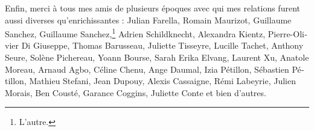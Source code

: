 \begin{otherlanguage}{french}
\begin{SingleSpace}
  Enfin, merci à tous mes amis de plusieurs époques avec qui mes relations
  furent aussi diverses qu'enrichissantes : Julian Farella, Romain
  Maurizot, Guillaume Sanchez, Guillaume Sanchez,\footnote{L'autre.} Adrien
  Schildknecht, Alexandra Kientz, Pierre-Olivier Di Giuseppe, Thomas
  Barusseau, Juliette Tisseyre, Lucille Tachet, Anthony Seure, Solène
  Pichereau, Yoann Bourse, Sarah Erika Elvang, Laurent Xu, Anatole Moreau,
  Arnaud Agbo, Céline Chenu, Ange Daumal, Izia Pétillon, Sébastien Pétillon,
  Mathieu Stefani, Jean Dupouy, Alexis Cassaigne, Rémi Labeyrie, Julien Morais,
  Ben Cousté, Garance Coggins, Juliette Conte et bien d'autres.

\end{SingleSpace}
\end{otherlanguage}
